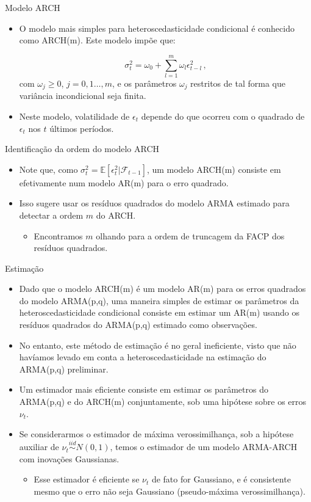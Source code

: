 \documentclass[11pt]{beamer}
\begin{document}
\begin{frame}{Modelo ARCH}
\begin{itemize}
	\item O modelo mais simples para heteroscedasticidade condicional é conhecido como {\color{blue}ARCH(m)}. Este modelo impõe que:
	
	$$\sigma^2_t = \omega_0 +\sum_{l=1}^m \omega_l \epsilon_{t-l}^2 \, ,$$
	com $\omega_j \geq 0$, $j=0,1\ldots, m$, e os parâmetros  $\omega_j$ restritos de tal forma que variância incondicional seja finita.
	\item Neste modelo, volatilidade de $\epsilon_t$ depende do que ocorreu com o quadrado  de $\epsilon_t$ nos $t$ últimos períodos.
	
\end{itemize}
\end{frame}

\begin{frame}{Identificação da ordem do modelo ARCH}
	\begin{itemize}
		\item Note que, como $\sigma^2_t= \mathbb{E}[\epsilon^2_t|\mathcal{F}_{t-1}]$, um modelo ARCH(m) consiste em efetivamente num modelo AR(m) para o erro quadrado.
		\item Isso sugere usar os resíduos quadrados do modelo ARMA estimado para detectar  a ordem $m$ do ARCH.
		\begin{itemize}
			\item Encontramos $m$ olhando para a ordem de truncagem da FACP dos resíduos quadrados.
		\end{itemize}
	\end{itemize}
\end{frame}

\begin{frame}{Estimação}
\begin{itemize}
	\item Dado que o modelo ARCH(m) é um modelo AR(m) para os erros quadrados do modelo ARMA(p,q), uma maneira simples de estimar os parâmetros da heteroscedasticidade condicional consiste em estimar um AR(m) usando os resíduos quadrados do ARMA(p,q) estimado como observações.
	\item No entanto, este método de estimação é no geral ineficiente, visto que não havíamos levado em conta a heteroscedasticidade na estimação do ARMA(p,q) preliminar.
	\item Um estimador mais eficiente consiste em estimar os parâmetros do ARMA(p,q) e do ARCH(m) {\color{blue}conjuntamente}, sob uma hipótese sobre os erros $\nu_t$.
	\item Se considerarmos o estimador de máxima verossimilhança, sob a hipótese auxiliar de $\nu_t \overset{iid}{\sim} N(0,1)$, temos o estimador de um modelo ARMA-ARCH com inovações Gaussianas.
	\begin{itemize}
		\item Esse estimador é eficiente se $\nu_t$ de fato for Gaussiano, e é consistente mesmo que o erro não seja Gaussiano (pseudo-máxima verossimilhança).
	\end{itemize}
\end{itemize}
\end{frame}
\end{document}
